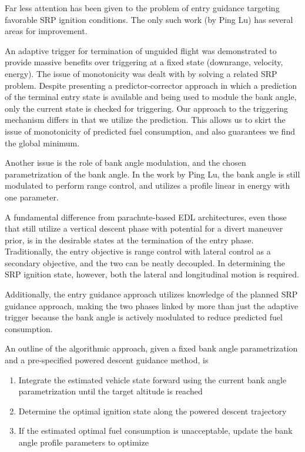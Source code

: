 \documentclass[]{article}
\begin{document}
Far less attention has been given to the problem of entry guidance targeting favorable SRP ignition conditions. The only such work (by Ping Lu) has several areas for improvement. 

An adaptive trigger for termination of unguided flight was demonstrated to provide massive benefits over triggering at a fixed state (downrange, velocity, energy). The issue of monotonicity was dealt with by solving a related SRP problem. Despite presenting a predictor-corrector approach in which a prediction of the terminal entry state is available and being used to module the bank angle, only the current state is checked for triggering. Our approach to the triggering mechanism differs in that we utilize the prediction. This allows us to skirt the issue of monotonicity of predicted fuel consumption, and also guarantees we find the global minimum. 

Another issue is the role of bank angle modulation, and the chosen parametrization of the bank angle. In the work by Ping Lu, the bank angle is still modulated to perform range control, and utilizes a profile linear in energy with one parameter. 

A fundamental difference from parachute-based EDL architectures, even those that still utilize a vertical descent phase with potential for a divert maneuver prior, is in the desirable states at the termination of the entry phase. Traditionally, the entry objective is range control with lateral control as a secondary objective, and the two can be neatly decoupled. In determining the SRP ignition state, however, both the lateral and longitudinal motion is required. 

Additionally, the entry guidance approach utilizes knowledge of the planned SRP guidance approach, making the two phases linked by more than just the adaptive trigger because the bank angle is actively modulated to reduce predicted fuel consumption. 

An outline of the algorithmic approach, given a fixed bank angle parametrization and a pre-specified powered descent guidance method, is 
\begin{enumerate}
\item Integrate the estimated vehicle state forward using the current bank angle parametrization until the target altitude is reached
\item Determine the optimal ignition state along the powered descent trajectory
\item If the estimated optimal fuel consumption is unacceptable, update the bank angle profile parameters to optimize 
\end{enumerate}
\end{document}
